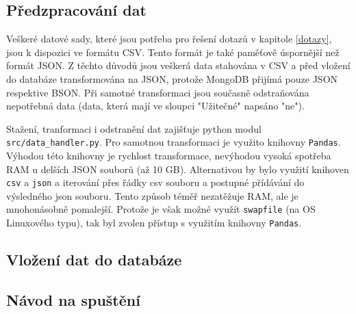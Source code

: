 \documentclass[12pt]{article}
\begin{document}
\subsection{Předzpracování dat}
\label{predzpracovani}
Veškeré datové sady, které jsou potřeba pro řešení dotazů v kapitole \ref{dotazy}, jsou k dispozici ve formátu CSV. Tento formát je také paměťově úspornější než formát JSON. Z těchto důvodů jsou veškerá data stahována v CSV a před vložení do databáze transformována na JSON, protože MongoDB přijímá pouze JSON respektive BSON. Při samotné transformaci jsou současně odstraňována nepotřebná data (data, která mají ve sloupci "Užitečné" napsáno "ne").

Stažení, tranformaci i odstranění dat zajišťuje python modul \texttt{src/data\_handler.py}. Pro samotnou transformaci je využito knihovny \texttt{Pandas}. Výhodou této knihovny je rychlost transformace, nevýhodou vysoká spotřeba RAM u delších JSON souborů (až 10 GB). Alternativou by bylo využití knihoven \texttt{csv} a \texttt{json} a iterování přes řádky csv souboru a postupné přídávání do výsledného json souboru. Tento způsob téměř nezatěžuje RAM, ale je mnohonásobně pomalejší. Protože je však možné využít \texttt{swapfile} (na OS Linuxového typu), tak byl zvolen přístup s využitím knihovny \texttt{Pandas}.

\subsection{Vložení dat do databáze}

\subsection{Návod na spuštění}



% 
%
\end{document}
